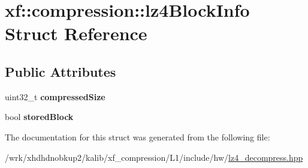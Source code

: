 \hypertarget{structxf_1_1compression_1_1lz4BlockInfo}{\section{xf\-:\-:compression\-:\-:lz4\-Block\-Info Struct Reference}
\label{structxf_1_1compression_1_1lz4BlockInfo}
}
\subsection*{Public Attributes}
\begin{DoxyCompactItemize}
\item 
\hypertarget{structxf_1_1compression_1_1lz4BlockInfo_afc520ad8a6b4a9434287649dd1483082}{uint32\-\_\-t {\bfseries compressed\-Size}}\label{structxf_1_1compression_1_1lz4BlockInfo_afc520ad8a6b4a9434287649dd1483082}

\item 
\hypertarget{structxf_1_1compression_1_1lz4BlockInfo_ae4eeb5bf41943f51a3db3e2bf569d742}{bool {\bfseries stored\-Block}}\label{structxf_1_1compression_1_1lz4BlockInfo_ae4eeb5bf41943f51a3db3e2bf569d742}

\end{DoxyCompactItemize}


The documentation for this struct was generated from the following file\-:\begin{DoxyCompactItemize}
\item 
/wrk/xhdhdnobkup2/kalib/xf\-\_\-compression/\-L1/include/hw/\hyperlink{lz4__decompress_8hpp}{lz4\-\_\-decompress.\-hpp}\end{DoxyCompactItemize}
